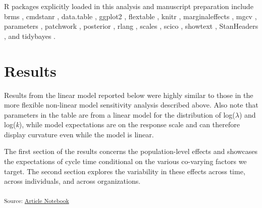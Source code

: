 \documentclass[manuscript,screen,review]{acmart}
\begin{document}
R packages explicitly loaded in this analysis and manuscript preparation
include brms
\citep[v2.22.7,][]{burknerAdvancedBayesianMultilevel2018, burknerBayesianItemResponse2021, burknerBrmsPackageBayesian2017},
cmdstanr \citep[v0.8.0,][]{gabryCmdstanrInterfaceCmdStan2024},
data.table \citep[v1.15.4,][]{barrettDatatableExtensionDataframe2024},
ggplot2 \citep[v3.5.0,][]{wickhamGgplot2ElegantGraphics2016}, flextable
\citep[v0.9.5,][]{gohelFlextableFunctionsTabular2024}, knitr
\citep[v1.46,][]{xieDynamicDocumentsKnitr2015, xieKnitrComprehensiveTool2014, xieKnitrGeneralpurposePackage2024},
marginaleffects
\citep[v0.19.0,][]{arel-bundockMarginaleffectsPredictionsComparisons2024},
mgcv
\citep[v1.9.0,][]{woodFastStableRestricted2011, woodGeneralizedAdditiveModels2017, woodSmoothingParameterModel2016, woodStableEfficientMultiple2004, woodThinplateRegressionSplines2003},
parameters \citep[v0.21.6,][]{ludeckeExtractingComputingExploring2020},
patchwork \citep[v1.2.0,][]{pedersenPatchworkComposerPlots2024},
posterior
\citep[v1.5.0,][]{burknerPosteriorToolsWorking2023, vehtariRanknormalizationFoldingLocalization2021},
rlang \citep[v1.1.3,][]{henryRlangFunctionsBase2024}, scales
\citep[v1.3.0,][]{wickhamScalesScaleFunctions2023}, scico
\citep[v1.5.0.9000,][]{pedersenScicoColourPalettes2025}, showtext
\citep[v0.9.7,][]{qiuShowtextUsingFonts2024}, StanHeaders
\citep[v2.36.0.9000,][]{standevelopmentteamStanHeadersHeadersInterface2020},
and tidybayes \citep[v3.0.6,][]{kayTidybayesTidyData2023}.

\section{Results}\label{results}

Results from the linear model reported below were highly similar to
those in the more flexible non-linear model sensitivity analysis
described above. Also note that parameters in the table are from a
linear model for the distribution of log(\(\lambda\)) and log(\emph{k}),
while model expectations are on the response scale and can therefore
display curvature even while the model is linear.

The first section of the results concerns the population-level effects
and showcases the expectations of cycle time conditional on the various
co-varying factors we target. The second section explores the
variability in these effects across time, across individuals, and across
organizations.

\textsubscript{Source:
\href{https://ps-data.github.io/uttvas-manuscript/index.qmd.html}{Article
Notebook}}
\end{document}
